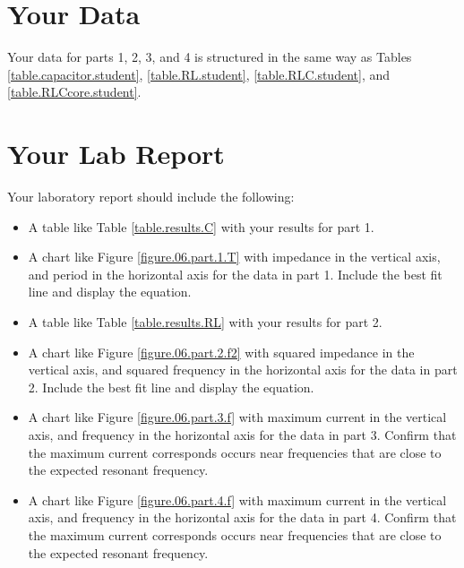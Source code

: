 \section{Your Data}
%
Your data for parts 1, 2, 3, and 4 is structured in the same way as Tables \ref{table.capacitor.student}, \ref{table.RL.student}, \ref{table.RLC.student}, and \ref{table.RLCcore.student}.
%
\pagebreak
\section{Your Lab Report}
%
Your laboratory report should include the following:
\begin{itemize}
	\item A table like Table \ref{table.results.C} with your results for part 1.
	\item A chart like Figure \ref{figure.06.part.1.T} with impedance in the vertical axis, and period in the horizontal axis for the data in part 1. Include the best fit line and display the equation.
	\item A table like Table \ref{table.results.RL} with your results for part 2.
	\item A chart like Figure \ref{figure.06.part.2.f2} with squared impedance in the vertical axis, and squared frequency in the horizontal axis for the data in part 2. Include the best fit line and display the equation.
	\item A chart like Figure \ref{figure.06.part.3.f} with maximum current in the vertical axis, and frequency in the horizontal axis for the data in part 3. Confirm that the maximum current corresponds occurs near frequencies that are close to the expected resonant frequency.
	\item A chart like Figure \ref{figure.06.part.4.f} with maximum current in the vertical axis, and frequency in the horizontal axis for the data in part 4. Confirm that the maximum current corresponds occurs near frequencies that are close to the expected resonant frequency.
\end{itemize}
%
\newpage

